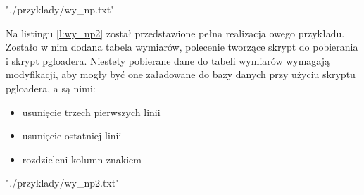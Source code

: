  {"./przyklady/wy_np.txt"}


Na listingu \ref{l:wy_np2} został przedstawione pełna realizacja owego przykładu.
Zostało w nim dodana tabela wymiarów,
 polecenie tworzące skrypt do pobierania
 i skrypt pgloadera.
Niestety pobierane dane do tabeli wymiarów wymagają modyfikacji,
 aby mogły być one załadowane do bazy danych przy użyciu skryptu pgloadera,
 a są nimi: 
\begin{itemize}
 \item usunięcie trzech pierwszych linii
 \item usunięcie ostatniej linii
 \item rozdzieleni kolumn znakiem 
\end{itemize}


 {"./przyklady/wy_np2.txt"}
